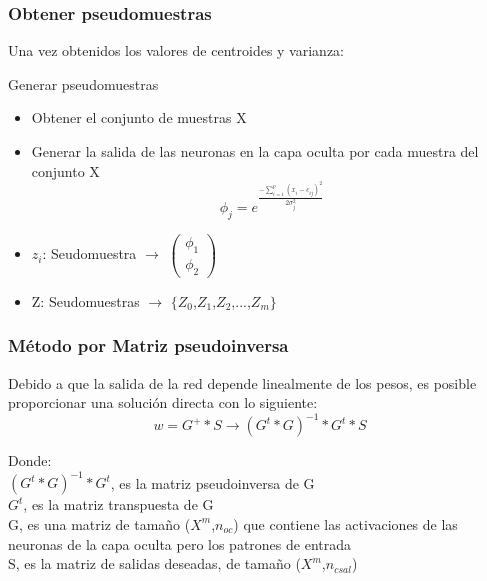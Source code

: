 \documentclass[
	11pt, %
]{beamer}
\begin{document}
\begin{frame}
  \frametitle{Obtener pseudomuestras}

  Una vez obtenidos los valores de centroides y varianza:

  \bigskip %
  
  Generar pseudomuestras\\
  \begin{itemize}
  \item Obtener el conjunto de muestras X
  \item Generar la salida de las neuronas en la capa oculta por cada muestra del conjunto X
    \[\phi_{j}=e^{\frac{-\sum_{i=1} ^{p} (x_{i}-c_{ij})^{2}}{2\sigma^{2}_{j}}}\]

  \item $z_{i}$: Seudomuestra $\rightarrow$
    $ \begin{pmatrix}
    \phi_{1} \\
    \phi_{2} 
  \end{pmatrix}  $
  \item Z: Seudomuestras $\rightarrow$ $\{Z_{0}$,$Z_{1}$,$Z_{2}$,...,$Z_{m}\}$
  \end{itemize}
\end{frame}

\begin{frame}
  \frametitle{Método por Matriz pseudoinversa}
  Debido a que la salida de la red depende linealmente de los pesos, es posible proporcionar una solución directa con lo siguiente:
  \[ w = G^{+} * S \rightarrow (G^{t}*G)^{-1} * G^{t} * S\]

  Donde:\\
  $(G^{t} * G)^{-1} * G^{t}$, es la matriz pseudoinversa de G\\
  $G^{t}$, es la matriz transpuesta de G\\
  G, es una matriz de tamaño ($X^{m}$,$n_{oc}$) que contiene las activaciones de las neuronas de la capa oculta pero los patrones de entrada\\
  S, es la matriz de salidas deseadas, de tamaño ($X^m$,$n_{csal}$)
  
\end{frame}
\end{document}
